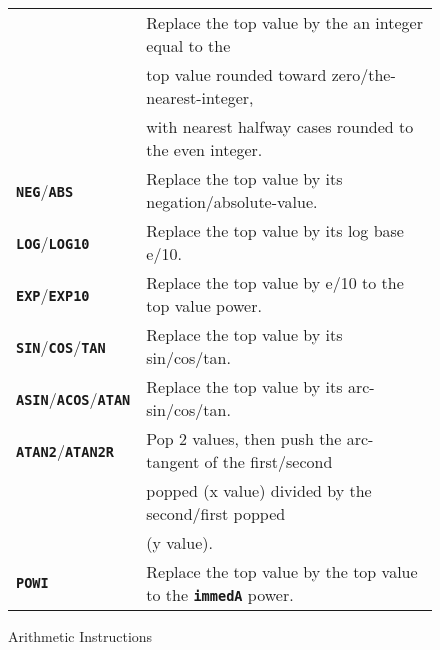 \documentclass[12pt]{article}
\makeatletter
\newcommand{\TT}[1]{{\tt \bfseries #1}}
\newcommand{\ttkey}[1]{\TT{#1}\index{#1@{\tt #1}}}
\newlength{\figurewidth}
\newenvironment{boxedfigure}[1][!btp]%
	{\begin{figure*}[#1]
	 \begin{lrbox}{\figurebox}
	 \begin{minipage}{\figurewidth}

	 \vspace*{1ex}}%
	{
	 \vspace*{1ex}

	 \end{minipage}
	 \end{lrbox}

	 \centering
	 \fbox{\hspace*{0.1in}\usebox{\figurebox}\hspace*{0.1in}}
	 \end{figure*}}
\makeatother
\begin{document}
\begin{boxedfigure}
\begin{center}
\begin{tabular}{|l|l|}
    & Replace the top value by the an integer equal to the \\
    & top value rounded toward zero/the-nearest-integer, \\
    & with nearest halfway cases rounded to the even integer.
\\\hline
\ttkey{NEG}/\ttkey{ABS}
    & Replace the top value by its negation/absolute-value.
\\\hline
\ttkey{LOG}/\ttkey{LOG10}
    & Replace the top value by its log base e/10.
\\\hline
\ttkey{EXP}/\ttkey{EXP10}
    & Replace the top value by e/10 to the top value power.
\\\hline
\ttkey{SIN}/\ttkey{COS}/\ttkey{TAN}
    & Replace the top value by its sin/cos/tan.
\\\hline
\ttkey{ASIN}/\ttkey{ACOS}/\ttkey{ATAN}
    & Replace the top value by its arc- sin/cos/tan.
\\\hline
\ttkey{ATAN2}/\ttkey{ATAN2R}
    & Pop 2 values, then push the arc-tangent of the first/second \\
    & popped (x value) divided by the second/first popped \\
    & (y value).
\\\hline
\ttkey{POWI}
    & Replace the top value by the top value to the \TT{immedA} power.
\\\hline
\end{tabular}
\end{center}
\caption{Arithmetic Instructions}
\label{ARITHMETIC-INSTRUCTIONS}
\end{boxedfigure}

\pagebreak
\end{document}

